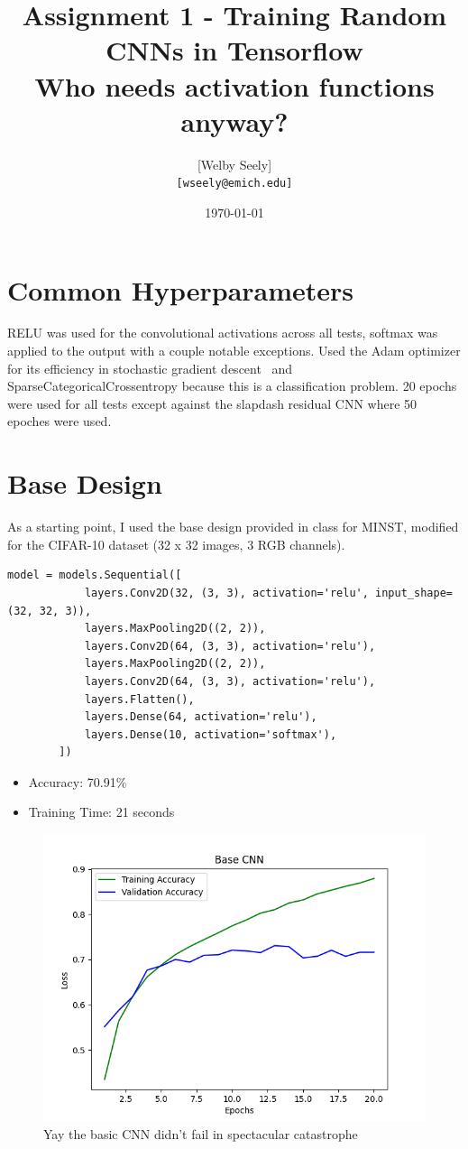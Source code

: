 \documentclass{article}
\title{Assignment 1 - Training Random CNNs in Tensorflow \\
\large Who needs activation functions anyway?}
\author{
    [Welby Seely] \\
    \texttt{[wseely@emich.edu]}
}
\date{\today}
\begin{document}
    \maketitle


    \section{Common Hyperparameters}\label{sec:preamble}

    RELU was used for the convolutional activations across all tests, softmax was applied to the output with a couple notable exceptions.
    Used the Adam optimizer for its efficiency in stochastic gradient descent~\cite{kingma2017adammethodstochasticoptimization} and SparseCategoricalCrossentropy because this is a classification problem.
    20 epochs were used for all tests except against the slapdash residual CNN where 50 epoches were used.


    \section{Base Design}\label{sec:base-design}

    As a starting point, I used the base design provided in class for MINST, modified for the CIFAR-10 dataset (32 x 32 images, 3 RGB channels).
    \\
    \begin{lstlisting}[label={lst:base_cnn}]
        model = models.Sequential([
            layers.Conv2D(32, (3, 3), activation='relu', input_shape=(32, 32, 3)),
            layers.MaxPooling2D((2, 2)),
            layers.Conv2D(64, (3, 3), activation='relu'),
            layers.MaxPooling2D((2, 2)),
            layers.Conv2D(64, (3, 3), activation='relu'),
            layers.Flatten(),
            layers.Dense(64, activation='relu'),
            layers.Dense(10, activation='softmax'),
        ])
    \end{lstlisting}

    \begin{itemize}
        \item Accuracy: 70.91\%
        \item Training Time: 21 seconds
    \end{itemize}

    \begin{figure}[!htbp]
        \centerline{\includegraphics[width=0.55\columnwidth]{Base CNN}}
        \caption{Yay the basic CNN didn't fail in spectacular catastrophe}
        \label{fig:base-cnn}
    \end{figure}
\end{document}
